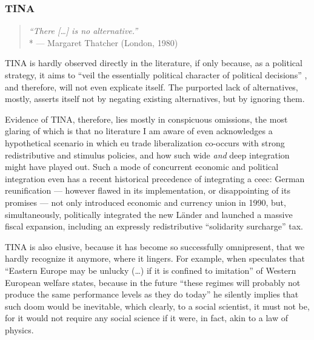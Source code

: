 \subsubsection{TINA}

\begin{quote}
	\emph{``There [\ldots] is no alternative.''}
	\\*
	--- Margaret Thatcher (London, 1980)
\end{quote}

TINA is hardly observed directly in the literature, if only because, as a political strategy, it aims to ``veil the essentially political character of political decisions'' \citep[314]{Bluhdorn-2007-aa}, and therefore, will not even explicate itself.
The purported lack of alternatives, mostly, asserts itself not by negating existing alternatives, but by ignoring them.

Evidence of TINA, therefore, lies mostly in conspicuous omissions, the most glaring of which is that no literature I am aware of even acknowledges a hypothetical scenario in which \gls{eu} trade liberalization co-occurs with strong redistributive and stimulus policies, and how such wide \emph{and} deep integration might have played out.
Such a mode of concurrent economic and political integration even has a recent historical precedence of integrating a \gls{ceec}:
German reunification --- however flawed in its implementation, or disappointing of its promises --- not only introduced economic and currency union in 1990, but, simultaneously, politically integrated the new Länder and launched a massive fiscal expansion, including an expressly redistributive ``solidarity surcharge'' tax.

TINA is also elusive, because it has become so successfully omnipresent, that we hardly recognize it anymore, where it lingers.
For example, when \citeauthor{Kovasc} speculates that ``Eastern Europe may be unlucky (\ldots) if it is confined to imitation'' of Western European welfare states, because in the future ``these regimes will probably not produce the same performance levels as they do today'' he silently implies that such doom would be inevitable, which clearly, to a social scientist, it must not be, for it would not require any social science if it were, in fact, akin to a law of physics.

